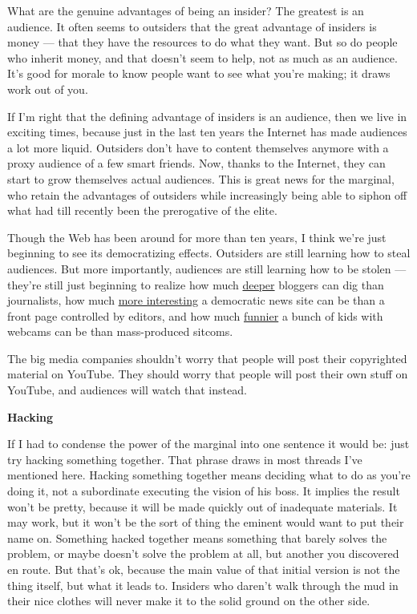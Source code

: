 What are the genuine advantages of being an insider? The greatest is an
audience. It often seems to outsiders that the great advantage of
insiders is money --- that they have the resources to do what they want.
But so do people who inherit money, and that doesn't seem to help, not
as much as an audience. It's good for morale to know people want to see
what you're making; it draws work out of you.

If I'm right that the defining advantage of insiders is an audience,
then we live in exciting times, because just in the last ten years the
Internet has made audiences a lot more liquid. Outsiders don't have to
content themselves anymore with a proxy audience of a few smart friends.
Now, thanks to the Internet, they can start to grow themselves actual
audiences. This is great news for the marginal, who retain the
advantages of outsiders while increasingly being able to siphon off what
had till recently been the prerogative of the elite.

Though the Web has been around for more than ten years, I think we're
just beginning to see its democratizing effects. Outsiders are still
learning how to steal audiences. But more importantly, audiences are
still learning how to be stolen --- they're still just beginning to
realize how much
\href{http://journalism.nyu.edu/pubzone/weblogs/pressthink/2004/03/15/lott_case.html}{deeper}
bloggers can dig than journalists, how much
\href{http://reddit.com}{more interesting} a democratic news site can be
than a front page controlled by editors, and how much
\href{http://www.youtube.com/watch?v=SLbFDMplZDs}{funnier} a bunch of
kids with webcams can be than mass-produced sitcoms.

The big media companies shouldn't worry that people will post their
copyrighted material on YouTube. They should worry that people will post
their own stuff on YouTube, and audiences will watch that instead.

\textbf{Hacking}

If I had to condense the power of the marginal into one sentence it
would be: just try hacking something together. That phrase draws in most
threads I've mentioned here. Hacking something together means deciding
what to do as you're doing it, not a subordinate executing the vision of
his boss. It implies the result won't be pretty, because it will be made
quickly out of inadequate materials. It may work, but it won't be the
sort of thing the eminent would want to put their name on. Something
hacked together means something that barely solves the problem, or maybe
doesn't solve the problem at all, but another you discovered en route.
But that's ok, because the main value of that initial version is not the
thing itself, but what it leads to. Insiders who daren't walk through
the mud in their nice clothes will never make it to the solid ground on
the other side.

